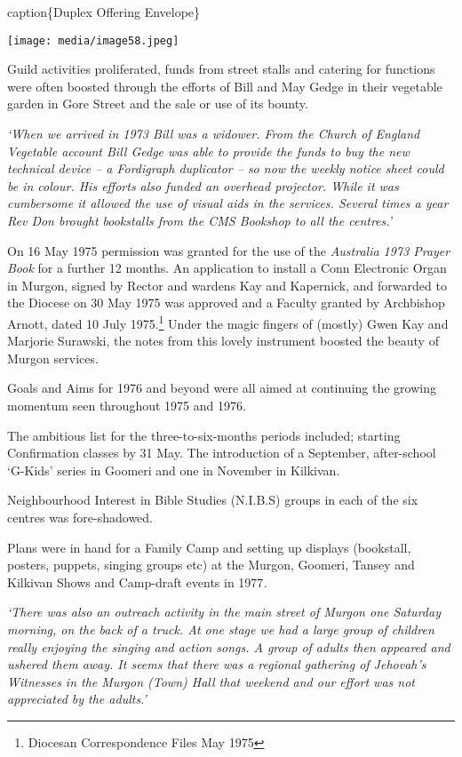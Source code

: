 caption\{Duplex Offering Envelope\}

\texttt{[image: media/image58.jpeg]}

Guild activities proliferated, funds from street stalls and catering for functions were often boosted through the efforts of Bill and May Gedge in their vegetable garden in Gore Street and the sale or use of its bounty.

\emph{`When we arrived in 1973 Bill was a widower. From the Church of England Vegetable account Bill Gedge was able to provide the funds to buy the new technical device -- a Fordigraph duplicator -- so now the weekly notice sheet could be in colour. His efforts also funded an overhead projector. While it was cumbersome it allowed the use of visual aids in the services. Several times a year Rev Don brought bookstalls from the CMS Bookshop to all the centres.'}

On 16 May 1975 permission was granted for the use of the \emph{Australia 1973 Prayer Book} for a further 12 months. An application to install a Conn Electronic Organ in Murgon, signed by Rector and wardens Kay and Kapernick, and forwarded to the Diocese on 30 May 1975 was approved and a Faculty granted by Archbishop Arnott, dated 10 July 1975.\footnote{Diocesan Correspondence Files May 1975} Under the magic fingers of (mostly) Gwen Kay and Marjorie Surawski, the notes from this lovely instrument boosted the beauty of Murgon services.

Goals and Aims for 1976 and beyond were all aimed at continuing the growing momentum seen throughout 1975 and 1976.

The ambitious list for the three-to-six-months periods included; starting Confirmation classes by 31 May. The introduction of a September, after-school `G-Kids' series in Goomeri and one in November in Kilkivan.

Neighbourhood Interest in Bible Studies (N.I.B.S) groups in each of the six centres was fore-shadowed.

Plans were in hand for a Family Camp and setting up displays (bookstall, posters, puppets, singing groups etc) at the Murgon, Goomeri, Tansey and Kilkivan Shows and Camp-draft events in 1977\emph{.}

\emph{`There was also an outreach activity in the main street of Murgon one Saturday morning, on the back of a truck. At one stage we had a large group of children really enjoying the singing and action songs. A group of adults then appeared and ushered them away. It seems that there was a regional gathering of Jehovah's Witnesses in the Murgon (Town) Hall that weekend and our effort was not appreciated by the adults.'}

